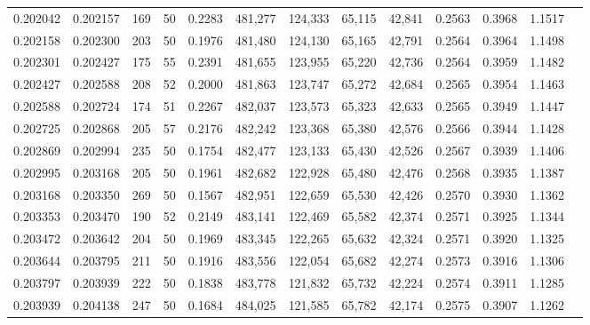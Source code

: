 \begin{tabular}{rrrrrrrrrrrrr}
0.202042 & 0.202157 &   169 &  50 &                                     0.2283 & 481,277 & 124,333 &  65,115 &  42,841 & 0.2563 & 0.3968 & 1.1517 \\
0.202158 & 0.202300 &   203 &  50 &                                     0.1976 & 481,480 & 124,130 &  65,165 &  42,791 & 0.2564 & 0.3964 & 1.1498 \\
0.202301 & 0.202427 &   175 &  55 &                                     0.2391 & 481,655 & 123,955 &  65,220 &  42,736 & 0.2564 & 0.3959 & 1.1482 \\
0.202427 & 0.202588 &   208 &  52 &                                     0.2000 & 481,863 & 123,747 &  65,272 &  42,684 & 0.2565 & 0.3954 & 1.1463 \\
0.202588 & 0.202724 &   174 &  51 &                                     0.2267 & 482,037 & 123,573 &  65,323 &  42,633 & 0.2565 & 0.3949 & 1.1447 \\
0.202725 & 0.202868 &   205 &  57 &                                     0.2176 & 482,242 & 123,368 &  65,380 &  42,576 & 0.2566 & 0.3944 & 1.1428 \\
0.202869 & 0.202994 &   235 &  50 &                                     0.1754 & 482,477 & 123,133 &  65,430 &  42,526 & 0.2567 & 0.3939 & 1.1406 \\
0.202995 & 0.203168 &   205 &  50 &                                     0.1961 & 482,682 & 122,928 &  65,480 &  42,476 & 0.2568 & 0.3935 & 1.1387 \\
0.203168 & 0.203350 &   269 &  50 &                                     0.1567 & 482,951 & 122,659 &  65,530 &  42,426 & 0.2570 & 0.3930 & 1.1362 \\
0.203353 & 0.203470 &   190 &  52 &                                     0.2149 & 483,141 & 122,469 &  65,582 &  42,374 & 0.2571 & 0.3925 & 1.1344 \\
0.203472 & 0.203642 &   204 &  50 &                                     0.1969 & 483,345 & 122,265 &  65,632 &  42,324 & 0.2571 & 0.3920 & 1.1325 \\
0.203644 & 0.203795 &   211 &  50 &                                     0.1916 & 483,556 & 122,054 &  65,682 &  42,274 & 0.2573 & 0.3916 & 1.1306 \\
0.203797 & 0.203939 &   222 &  50 &                                     0.1838 & 483,778 & 121,832 &  65,732 &  42,224 & 0.2574 & 0.3911 & 1.1285 \\
0.203939 & 0.204138 &   247 &  50 &                                     0.1684 & 484,025 & 121,585 &  65,782 &  42,174 & 0.2575 & 0.3907 & 1.1262 \\

\end{tabular}

